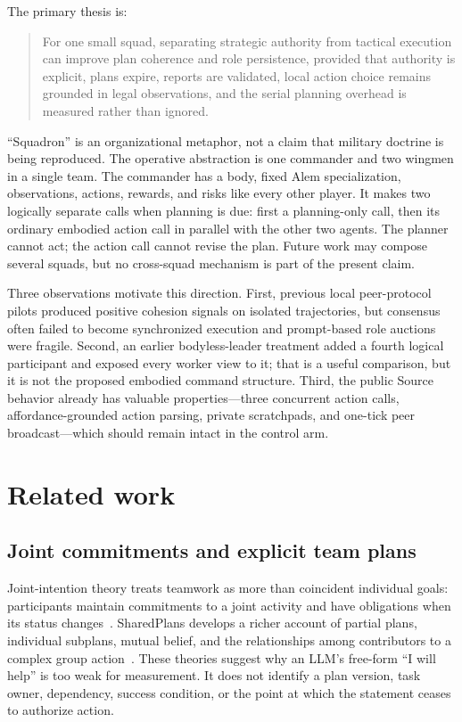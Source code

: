 \documentclass[11pt]{article}
\begin{document}
The primary thesis is:

\begin{quote}
For one small squad, separating strategic authority from tactical execution can
improve plan coherence and role persistence, provided that authority is explicit,
plans expire, reports are validated, local action choice remains grounded in legal
observations, and the serial planning overhead is measured rather than ignored.
\end{quote}

``Squadron'' is an organizational metaphor, not a claim that military doctrine is
being reproduced.  The operative abstraction is one commander and two wingmen in
a single team.  The commander has a body, fixed Alem specialization, observations,
actions, rewards, and risks like every other player.  It makes two logically
separate calls when planning is due: first a planning-only call, then its ordinary
embodied action call in parallel with the other two agents.  The planner cannot
act; the action call cannot revise the plan.  Future work may compose several
squads, but no cross-squad mechanism is part of the present claim.

Three observations motivate this direction.  First, previous local peer-protocol
pilots produced positive cohesion signals on isolated trajectories, but consensus
often failed to become synchronized execution and prompt-based role auctions were
fragile.  Second, an earlier bodyless-leader treatment added a fourth logical
participant and exposed every worker view to it; that is a useful comparison, but
it is not the proposed embodied command structure.  Third, the public Source
behavior already has valuable properties---three concurrent action calls,
affordance-grounded action parsing, private scratchpads, and one-tick peer
broadcast---which should remain intact in the control arm.

\section{Related work}

\subsection{Joint commitments and explicit team plans}

Joint-intention theory treats teamwork as more than coincident individual goals:
participants maintain commitments to a joint activity and have obligations when
its status changes~\citep{cohen1991teamwork}.  SharedPlans develops a richer account
of partial plans, individual subplans, mutual belief, and the relationships among
contributors to a complex group action~\citep{grosz1996sharedplans}.  These theories
suggest why an LLM's free-form ``I will help'' is too weak for measurement.  It
does not identify a plan version, task owner, dependency, success condition, or
the point at which the statement ceases to authorize action.
\end{document}
